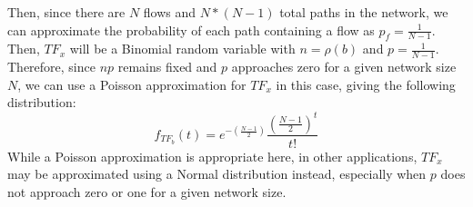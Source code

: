 Then, since there are $N$ flows and $N*(N-1)$ total paths in the network, we can approximate the probability of each path containing a flow as $p_f = \frac{1}{N-1}$.  Then, $TF_x$ will be a Binomial random variable with $n=\rho(b)$ and $p=\frac{1}{N-1}$.  Therefore, since $np$ remains fixed and $p$ approaches zero for a given network size $N$, we can use a Poisson approximation for $TF_x$ in this case, giving the following distribution:  
\begin{equation*}
	f_{TF_b}(t) = e^{-(\frac{N-1}{2})}\frac{(\frac{N-1}{2})^{t}}{t!}
\end{equation*}
While a Poisson approximation is appropriate here, in other applications, $TF_x$ may be approximated using a Normal distribution instead, especially when $p$ does not approach zero or one for a given network size.   

%
%
%


